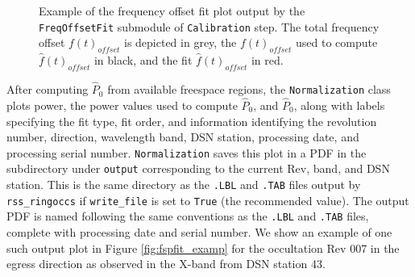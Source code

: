 \documentclass[titlepage, 12pt]{article}
\begin{document}
\begin{appendix}
\begin{figure}[H]
                    {Example of the frequency offset fit plot output
                     by the \texttt{FreqOffsetFit} submodule of
                     \texttt{Calibration} step. The total frequency offset
                      $f(t)_{offset}$ is depicted in grey,
                     the $f(t)_{offset}$ used to compute $\hat{f}(t)_{offset}$
                     in black, and the fit $\hat{f}(t)_{offset}$ in red.}
                \label{fig:forfit_examp}
            \end{figure} 
            After computing $\hat{P}_{0}$ from available freespace regions,
            the \texttt{Normalization} class plots power, the power values used
            to compute $\hat{P}_{0}$, and $\hat{P}_{0}$, along with labels
            specifying the fit type, fit order, and information identifying
            the revolution number, direction, wavelength band, DSN station,
            processing date, and processing serial number. \texttt{Normalization}
            saves this plot in a PDF in the subdirectory under \texttt{output}
            corresponding to the current Rev, band, and DSN station. This is
            the same directory as the \texttt{.LBL} and \texttt{.TAB} files
            output by \texttt{rss\_ringoccs} if \texttt{write\_file} is set
            to \texttt{True} (the recommended value). The output PDF is named
            following the same conventions as the \texttt{.LBL} and \texttt{.TAB}
            files, complete with processing date and serial number. We show an
            example of one such output plot in Figure \ref{fig:fspfit_examp} for
            the occultation Rev 007 in the egress direction as observed in the
            X-band from DSN station 43.

\end{appendix}
\end{document}
